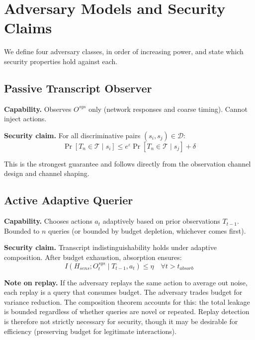 \documentclass[11pt,a4paper]{article}
\begin{document}
\section{Adversary Models and Security Claims}\label{sec:adversary}

We define four adversary classes, in order of increasing power, and state which security properties hold against each.

\subsection{Passive Transcript Observer}

\textbf{Capability.} Observes $O^{sys}$ only (network responses and coarse timing). Cannot inject actions.

\textbf{Security claim.} For all discriminative pairs $(s_i, s_j) \in \mathcal{D}$:
\begin{equation}
\Pr[T_n \in \mathcal{T} \mid s_i] \le e^{\varepsilon} \Pr[T_n \in \mathcal{T} \mid s_j] + \delta
\end{equation}

This is the strongest guarantee and follows directly from the observation channel design and channel shaping.

\subsection{Active Adaptive Querier}

\textbf{Capability.} Chooses actions $a_t$ adaptively based on prior observations $T_{t-1}$. Bounded to $n$ queries (or bounded by budget depletion, whichever comes first).

\textbf{Security claim.} Transcript indistinguishability holds under adaptive composition. After budget exhaustion, absorption ensures:
\begin{equation}
I(H_{sens}; O^{sys}_{t} \mid T_{t-1}, a_t) \le \eta \quad \forall t > t_{absorb}
\end{equation}

\textbf{Note on replay.} If the adversary replays the same action to average out noise, each replay is a query that consumes budget. The adversary trades budget for variance reduction. The composition theorem accounts for this: the total leakage is bounded regardless of whether queries are novel or repeated. Replay detection is therefore not strictly necessary for security, though it may be desirable for efficiency (preserving budget for legitimate interactions).
\end{document}
